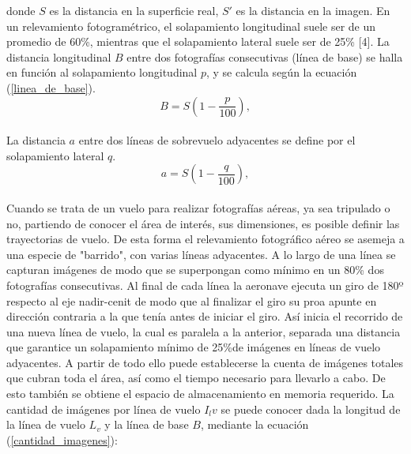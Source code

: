 donde $S$ es la distancia en la superficie real, $S'$ es la distancia en la imagen.
En un relevamiento fotogramétrico, el solapamiento longitudinal suele ser de un promedio de 60\%, mientras que el solapamiento lateral suele ser de 25\% [4]. La distancia longitudinal $B$ entre dos fotografías consecutivas (línea de base) se halla en función al solapamiento longitudinal $p$, y se calcula según la ecuación (\ref{linea_de_base}).
\\
\begin{equation}
	B=S(1-\frac{p}{100}),\label{linea_de_base}
\end{equation}
\\
La distancia $a$ entre dos líneas de sobrevuelo adyacentes se define por el solapamiento lateral $q$.
\\
\begin{equation}
	a=S(1-\frac{q}{100}),\label{distancia_adyacente}
\end{equation}
\\
Cuando se trata de un vuelo para realizar fotografías aéreas, ya sea tripulado o no, partiendo de conocer el área de interés, sus dimensiones, es posible definir las trayectorias de vuelo. De esta forma el relevamiento fotográfico aéreo se asemeja a una especie de "barrido", con varias líneas adyacentes. A lo largo de una línea se capturan imágenes de modo que se superpongan como mínimo en un 80\% dos fotografías consecutivas. Al final de cada línea la aeronave ejecuta un giro de 180º respecto al eje nadir-cenit de modo que al finalizar el giro su proa apunte en dirección contraria a la que tenía antes de iniciar el giro. Así inicia el recorrido de una nueva línea de vuelo, la cual es paralela a la anterior, separada una distancia que garantice un solapamiento mínimo de 25\%de imágenes en líneas de vuelo adyacentes. A partir de todo ello puede establecerse la cuenta de imágenes totales que cubran toda el área, así como el tiempo necesario para llevarlo a cabo. De esto también se obtiene el espacio de almacenamiento en memoria requerido.
La cantidad de imágenes por línea de vuelo $I_lv$ se puede conocer dada la longitud de la línea de vuelo $L_v$ y la línea de base $B$, mediante la ecuación (\ref{cantidad_imagenes}):
